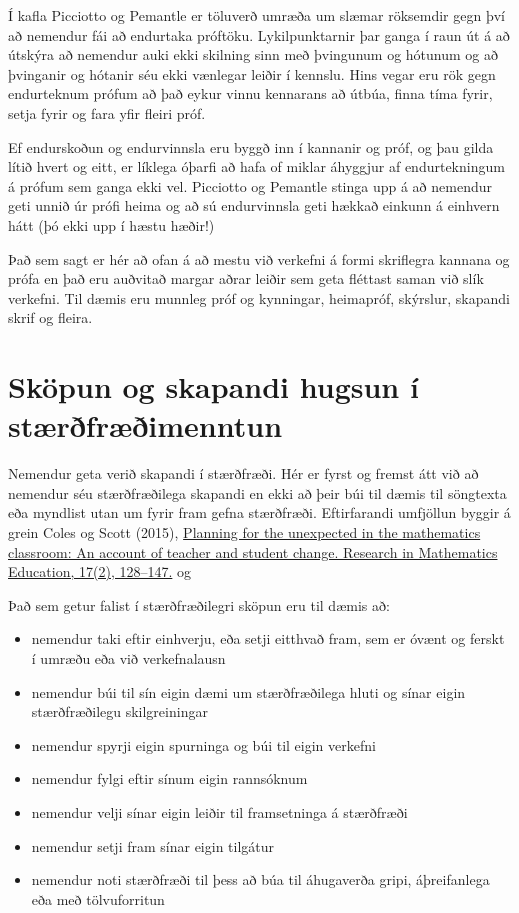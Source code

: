 \documentclass[
  icelandic,
]{book}
\providecommand{\tightlist}{%
  \setlength{\itemsep}{0pt}\setlength{\parskip}{0pt}}
\theoremstyle{definition}
\theoremstyle{definition}
\theoremstyle{definition}
\theoremstyle{definition}
\theoremstyle{remark}
\begin{document}
Í kafla Picciotto og Pemantle er töluverð umræða um slæmar röksemdir gegn því að nemendur fái að endurtaka próftöku. Lykilpunktarnir þar ganga í raun út á að útskýra að nemendur auki ekki skilning sinn með þvingunum og hótunum og að þvinganir og hótanir séu ekki vænlegar leiðir í kennslu. Hins vegar eru rök gegn endurteknum prófum að það eykur vinnu kennarans að útbúa, finna tíma fyrir, setja fyrir og fara yfir fleiri próf.

Ef endurskoðun og endurvinnsla eru byggð inn í kannanir og próf, og þau gilda lítið hvert og eitt, er líklega óþarfi að hafa of miklar áhyggjur af endurtekningum á prófum sem ganga ekki vel. Picciotto og Pemantle stinga upp á að nemendur geti unnið úr prófi heima og að sú endurvinnsla geti hækkað einkunn á einhvern hátt (þó ekki upp í hæstu hæðir!)

Það sem sagt er hér að ofan á að mestu við verkefni á formi skriflegra kannana og prófa en það eru auðvitað margar aðrar leiðir sem geta fléttast saman við slík verkefni. Til dæmis eru munnleg próf og kynningar, heimapróf, skýrslur, skapandi skrif og fleira.

\chapter{Sköpun og skapandi hugsun í stærðfræðimenntun}\label{skopun}

Nemendur geta verið skapandi í stærðfræði. Hér er fyrst og fremst átt við að nemendur séu stærðfræðilega skapandi en ekki að þeir búi til dæmis til söngtexta eða myndlist utan um fyrir fram gefna stærðfræði. Eftirfarandi umfjöllun byggir á grein Coles og Scott (2015), \href{https://doi.org/10.1080/14794802.2015.1047787}{Planning for the unexpected in the mathematics classroom: An account of teacher and student change. Research in Mathematics Education, 17(2), 128--147.} og

Það sem getur falist í stærðfræðilegri sköpun eru til dæmis að:

\begin{itemize}
\tightlist
\item
  nemendur taki eftir einhverju, eða setji eitthvað fram, sem er óvænt og ferskt í umræðu eða við verkefnalausn
\item
  nemendur búi til sín eigin dæmi um stærðfræðilega hluti og sínar eigin stærðfræðilegu skilgreiningar
\item
  nemendur spyrji eigin spurninga og búi til eigin verkefni
\item
  nemendur fylgi eftir sínum eigin rannsóknum
\item
  nemendur velji sínar eigin leiðir til framsetninga á stærðfræði
\item
  nemendur setji fram sínar eigin tilgátur
\item
  nemendur noti stærðfræði til þess að búa til áhugaverða gripi, áþreifanlega eða með tölvuforritun
\end{itemize}
\end{document}
